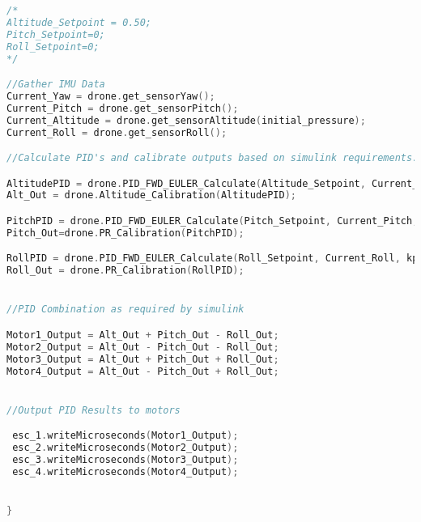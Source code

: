 \begin{lstlisting}[language=C,caption={Main.ino Drone Flight Program},label={lst:main.ino}]
/*
Altitude_Setpoint = 0.50;
Pitch_Setpoint=0;
Roll_Setpoint=0;
*/

//Gather IMU Data
Current_Yaw = drone.get_sensorYaw();
Current_Pitch = drone.get_sensorPitch();
Current_Altitude = drone.get_sensorAltitude(initial_pressure);
Current_Roll = drone.get_sensorRoll();

//Calculate PID's and calibrate outputs based on simulink requirements.

AltitudePID = drone.PID_FWD_EULER_Calculate(Altitude_Setpoint, Current_Altitude, kp_alt, kd_alt, ki_alt, Ts, N_alt);
Alt_Out = drone.Altitude_Calibration(AltitudePID);

PitchPID = drone.PID_FWD_EULER_Calculate(Pitch_Setpoint, Current_Pitch, kp_PR, kd_PR, ki_PR, Ts, N_PR);
Pitch_Out=drone.PR_Calibration(PitchPID);

RollPID = drone.PID_FWD_EULER_Calculate(Roll_Setpoint, Current_Roll, kp_PR, kd_PR, ki_PR, Ts, N_PR);
Roll_Out = drone.PR_Calibration(RollPID);


//PID Combination as required by simulink

Motor1_Output = Alt_Out + Pitch_Out - Roll_Out;
Motor2_Output = Alt_Out - Pitch_Out - Roll_Out;
Motor3_Output = Alt_Out + Pitch_Out + Roll_Out;
Motor4_Output = Alt_Out - Pitch_Out + Roll_Out;


//Output PID Results to motors

 esc_1.writeMicroseconds(Motor1_Output);
 esc_2.writeMicroseconds(Motor2_Output);
 esc_3.writeMicroseconds(Motor3_Output);
 esc_4.writeMicroseconds(Motor4_Output);


}

\end{lstlisting}
